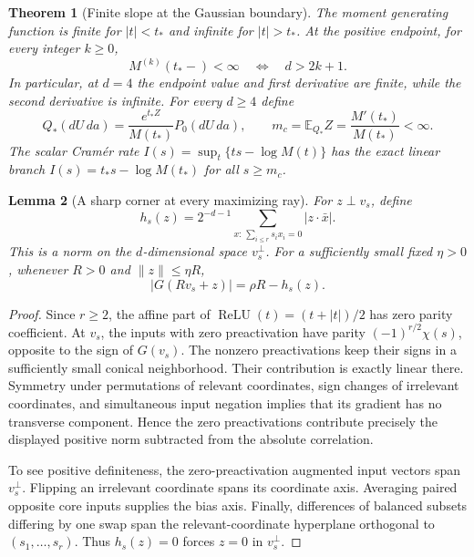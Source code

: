 \documentclass[11pt]{article}
\newtheorem{theorem}{Theorem}
\newtheorem{lemma}[theorem]{Lemma}
\newcommand{\E}{\mathbb E}
\newcommand{\relu}{\operatorname{ReLU}}
\begin{document}
\begin{theorem}[Finite slope at the Gaussian boundary]\label{thm:boundary}
The moment generating function is finite for $|t|<t_*$ and infinite for
$|t|>t_*$. At the positive endpoint, for every integer $k\ge0$,
\[
 M^{(k)}(t_*-)<\infty\quad\Longleftrightarrow\quad d>2k+1.
\]
In particular, at $d=4$ the endpoint value and first derivative are finite,
while the second derivative is infinite. For every $d\ge4$ define
\[
 Q_*(dU\,da)=\frac{e^{t_*Z}}{M(t_*)}P_0(dU\,da),\qquad
 m_c=\E_{Q_*}Z=\frac{M'(t_*)}{M(t_*)}<\infty.
\]
The scalar Cram\'er rate $I(s)=\sup_t\{ts-\log M(t)\}$ has the exact
linear branch $I(s)=t_*s-\log M(t_*)$ for all $s\ge m_c$.
\end{theorem}

\begin{lemma}[A sharp corner at every maximizing ray]\label{lem:corner}
For $z\perp v_s$, define
\[
 h_s(z)=2^{-d-1}\sum_{x:\,\sum_{i\le r}s_ix_i=0}
                   |z\cdot\bar x|.
\]
This is a norm on the $d$-dimensional space $v_s^\perp$. For a sufficiently
small fixed $\eta>0$, whenever $R>0$ and $\|z\|\le\eta R$,
\[
 |G(Rv_s+z)|=\rho R-h_s(z).
\]
\end{lemma}
\begin{proof}
Since $r\ge2$, the affine part of $\relu(t)=(t+|t|)/2$ has zero
parity coefficient. At $v_s$, the inputs with zero preactivation have
parity $(-1)^{r/2}\chi(s)$, opposite to the sign of $G(v_s)$.
The nonzero preactivations keep their signs in a sufficiently small
conical neighborhood. Their contribution is exactly linear there.
Symmetry under permutations of relevant coordinates, sign changes of
irrelevant coordinates, and simultaneous input negation implies that its
gradient has no transverse component. Hence the zero preactivations
contribute precisely the displayed positive norm subtracted from the
absolute correlation.

To see positive definiteness, the zero-preactivation augmented input
vectors span $v_s^\perp$. Flipping an irrelevant coordinate spans its
coordinate axis. Averaging paired opposite core inputs supplies the bias
axis. Finally, differences of balanced subsets differing by one swap span
the relevant-coordinate hyperplane orthogonal to $(s_1,\ldots,s_r)$.
Thus $h_s(z)=0$ forces $z=0$ in $v_s^\perp$.
\end{proof}
\end{document}
